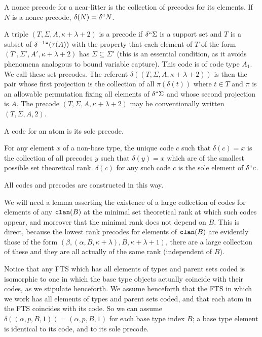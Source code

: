 \documentclass{article}
\begin{document}
\begin{description}
A nonce precode for a near-litter is the collection of precodes for its elements.   If $N$ is a nonce precode, $\delta(N) = \delta``N$.

A triple $(T,\Sigma,A,\kappa+\lambda+2)$ is a precode if
$\delta``\Sigma$ is a support set and $T$ is a subset of $\delta^{-1}``(\tau(A))$ with the property that each element of $T$ of the form $(T',\Sigma',A',\kappa+\lambda+2)$
has $\Sigma \subseteq \Sigma'$ (this is an essential condition, as it avoids phenomena analogous to bound variable capture).   This code is of code type $A_1$.  We call these set precodes.  The referent  $\delta((T,\Sigma,A,\kappa+\lambda+2))$
is then the pair whose first projection is the collection of all $\pi(\delta(t))$ where $t \in T$ and $\pi$ is an allowable permutation fixing all elements of $\delta``\Sigma$ and whose second projection is $A$.  The precode $(T,\Sigma,A,\kappa+\lambda+2)$
may be conventionally written $(T,\Sigma,A,2)$.

A code for an atom is its sole precode.

For any element $x$ of a non-base type, the unique code $c$ such that $\delta(c)=x$ is the collection of all precodes $y$ such that $\delta(y)=x$ which are of the smallest possible set theoretical rank.   $\delta(c)$ for any such code $c$ is the sole element of $\delta``c$.

All codes and precodes are constructed in this way.

\end{description}

We will need a lemma asserting the existence of  a large collection of codes for elements of any ${\tt clan}(B)$ at the minimal set theoretical rank at which such codes appear, and moreover that the minimal rank does not depend on $B$.   This is direct, because the lowest rank precodes for elements of ${\tt clan}(B)$ are evidently those of the form $(\beta,(\alpha,B,\kappa+\lambda),B,\kappa+\lambda+1)$,
there are a large collection of these and they are all actually of the same rank (independent of $B$).

Notice that any FTS which has all elements of types and parent sets coded is isomorphic to one in which the base type objects actually coincide with their codes, as we stipulate henceforth.   We assume henceforth that the FTS in which we work has all elements of types and parent sets coded, and that each atom in the FTS coincides with its code.
So we can assume $\delta((\alpha,p,B,1))  =  (\alpha,p,B,1)$  for each base type index $B$;  a base type element is identical to its code, and to its sole precode.
\end{document}
